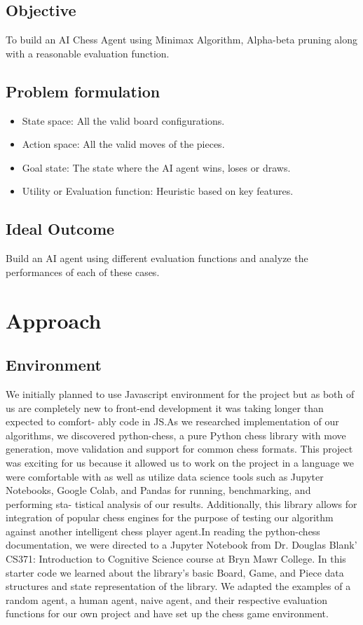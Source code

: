\documentclass[12pt]{article}
\begin{document}
\subsection{Objective}
To build an AI Chess Agent using Minimax Algorithm, Alpha-beta pruning along with a reasonable evaluation function.

\subsection{Problem formulation}
\begin{itemize}
\item State space: All the valid board configurations.
\item Action space: All the valid moves of the pieces.
\item Goal state: The state where the AI agent wins, loses or draws.
\item Utility or Evaluation function: Heuristic based on key features.
\end{itemize}	

\subsection{Ideal Outcome}Build an AI agent using different evaluation functions and analyze the performances of each of these cases.


\section{Approach}
\subsection{Environment}
We initially planned to use Javascript environment for the project but as both of us are
completely new to front-end development it was taking longer than expected to comfort-
ably code in JS.As we researched implementation of our algorithms, we discovered python-chess, a pure
Python chess library with move generation, move validation and support for common chess
formats. This project was exciting for us because it allowed us to work on the project in
a language we were comfortable with as well as utilize data science tools such as Jupyter
Notebooks, Google Colab, and Pandas for running, benchmarking, and performing sta-
tistical analysis of our results. Additionally, this library allows for integration of popular
chess engines for the purpose of testing our algorithm against another intelligent chess
player agent.In reading the python-chess documentation, we were directed to a Jupyter Notebook
from Dr. Douglas Blank' CS371: Introduction to Cognitive Science course at Bryn Mawr
College. In this starter code we learned about the library's basic Board, Game, and
Piece data structures and state representation of the library. We adapted the examples
of a random agent, a human agent, naive agent, and their respective evaluation functions
for our own project and have set up the chess game environment.
\end{document}
